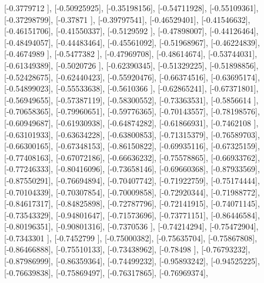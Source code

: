 \documentclass{article}
\begin{document}
       [-0.3779712 ],
       [-0.50925925],
       [-0.35198156],
       [-0.54711928],
       [-0.55109361],
       [-0.37298799],
       [-0.37871   ],
       [-0.39797541],
       [-0.46529401],
       [-0.41546632],
       [-0.46151706],
       [-0.41550337],
       [-0.5129592 ],
       [-0.47898007],
       [-0.44126464],
       [-0.48494057],
       [-0.44483464],
       [-0.45561092],
       [-0.51968967],
       [-0.46224839],
       [-0.4674989 ],
       [-0.5477382 ],
       [-0.47969708],
       [-0.48614674],
       [-0.53744031],
       [-0.61349389],
       [-0.5020726 ],
       [-0.62390345],
       [-0.51329225],
       [-0.51898856],
       [-0.52428675],
       [-0.62440423],
       [-0.55920476],
       [-0.66374516],
       [-0.63695174],
       [-0.54899023],
       [-0.55533638],
       [-0.5610366 ],
       [-0.62865241],
       [-0.67371801],
       [-0.56949655],
       [-0.57387119],
       [-0.58300552],
       [-0.73363531],
       [-0.5856614 ],
       [-0.70658365],
       [-0.79960651],
       [-0.59776365],
       [-0.70143557],
       [-0.78198576],
       [-0.60949687],
       [-0.61930938],
       [-0.64874282],
       [-0.61866931],
       [-0.7462108 ],
       [-0.63101933],
       [-0.63634228],
       [-0.63800853],
       [-0.71315379],
       [-0.76589703],
       [-0.66300165],
       [-0.67348153],
       [-0.86150822],
       [-0.69935116],
       [-0.67325159],
       [-0.77408163],
       [-0.67072186],
       [-0.66636232],
       [-0.75578865],
       [-0.66933762],
       [-0.77246333],
       [-0.80416096],
       [-0.73658146],
       [-0.69660368],
       [-0.87933569],
       [-0.87550291],
       [-0.76694894],
       [-0.70407742],
       [-0.71922759],
       [-0.75174444],
       [-0.70104339],
       [-0.70307854],
       [-0.70009858],
       [-0.72920344],
       [-0.71988772],
       [-0.84617317],
       [-0.84825898],
       [-0.72787796],
       [-0.72141915],
       [-0.74071145],
       [-0.73543329],
       [-0.94801647],
       [-0.71573696],
       [-0.73771151],
       [-0.86446584],
       [-0.80196351],
       [-0.90801316],
       [-0.7370536 ],
       [-0.74214294],
       [-0.75472904],
       [-0.7343301 ],
       [-0.7452799 ],
       [-0.75000382],
       [-0.75635704],
       [-0.75867808],
       [-0.86466888],
       [-0.75510133],
       [-0.73438962],
       [-0.78498   ],
       [-0.76793232],
       [-0.87986999],
       [-0.86359364],
       [-0.74499232],
       [-0.95893242],
       [-0.94525225],
       [-0.76639838],
       [-0.75869497],
       [-0.76317865],
       [-0.76969374],
\end{document}
